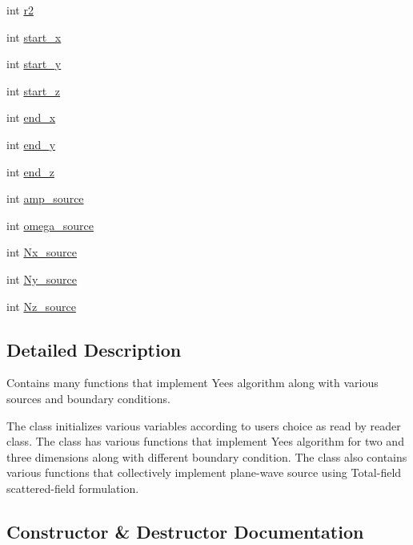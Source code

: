 \begin{DoxyCompactItemize}
\item 
int \hyperlink{classmaxwell_a959502e24d5d905521da8bb2aa4e4780}{r2}
\item 
int \hyperlink{classmaxwell_a74771f4501b47621a65bc635f1835391}{start\+\_\+x}
\item 
int \hyperlink{classmaxwell_a94431c9f918c0dd0dd64fa0f16b6e966}{start\+\_\+y}
\item 
int \hyperlink{classmaxwell_a78f4a1897bee44d03cfc0b661e09dc8e}{start\+\_\+z}
\item 
int \hyperlink{classmaxwell_ae9eb048f015df5a63df82e81a7992afa}{end\+\_\+x}
\item 
int \hyperlink{classmaxwell_a43edb6394c7e1e7c2791cd33f15a704f}{end\+\_\+y}
\item 
int \hyperlink{classmaxwell_a6669d673ec8bff76299f6a879558aab7}{end\+\_\+z}
\item 
int \hyperlink{classmaxwell_a3b319987a65dc17fcf8e384cdc131fc7}{amp\+\_\+source}
\item 
int \hyperlink{classmaxwell_a407b67012a9db173bcc97a0387ad3804}{omega\+\_\+source}
\item 
int \hyperlink{classmaxwell_afb46767f44dd0c6628b46ae2a3d7d5f3}{Nx\+\_\+source}
\item 
int \hyperlink{classmaxwell_a5e7719b20906c564538f8439fc379493}{Ny\+\_\+source}
\item 
int \hyperlink{classmaxwell_adc2e00e20142a6f908ad97be1b8250ab}{Nz\+\_\+source}
\end{DoxyCompactItemize}


\subsection{Detailed Description}
Contains many functions that implement Yee\textquotesingle{}s algorithm along with various sources and boundary conditions. 

The class initializes various variables according to user\textquotesingle{}s choice as read by reader class. The class has various functions that implement Yee\textquotesingle{}s algorithm for two and three dimensions along with different boundary condition. The class also contains various functions that collectively implement plane-\/wave source using Total-\/field scattered-\/field formulation. 

\subsection{Constructor \& Destructor Documentation}
